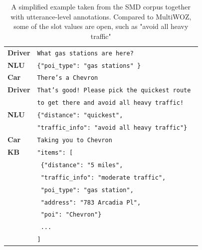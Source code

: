 \begin{table}[tp]
    \centering
    \begin{tabular}{l|l}
    \toprule
         \textbf{Driver} & \texttt{What {\color{cyan!80!yellow!80!black!100}gas stations} are here?} \\
         \textbf{NLU} & \texttt{\{"poi\_type": "{\color{cyan!80!yellow!80!black!100}gas stations}" \}} \\
         \textbf{Car} & \texttt{There's a Chevron} \\
         \textbf{Driver} & \texttt{That's good! Please pick the {\color{cyan!80!yellow!80!black!100}quickest} route }\\ & \texttt{to get there and {\color{orange!50!yellow!90!black!100!}avoid all heavy traffic}!} \\
         \textbf{NLU} & \texttt{\{"distance": "{\color{cyan!80!yellow!80!black!100}quickest}",} \\
            & \texttt{"traffic\_info": "{\color{orange!50!yellow!90!black!100!}avoid all heavy traffic}"\} }\\
         \textbf{Car} & \texttt{Taking you to Chevron} \\
         \midrule
         \textbf{KB} & \texttt{"items": [} \\
          & \texttt{    \{"distance": "5 miles",} \\
          & \texttt{    "traffic\_info": "moderate traffic",} \\
          & \texttt{    "poi\_type": "gas station",} \\
          & \texttt{    "address": "783 Arcadia Pl",} \\
          & \texttt{    "poi": "Chevron"\}} \\
          & \texttt{    ...} \\
          & \texttt{]} \\
          \bottomrule
    \end{tabular}
    \caption{A simplified example taken from the SMD corpus together with utterance-level annotations. Compared to MultiWOZ, some of the slot values are open, such as "avoid all heavy traffic"}
    \label{02:tab:smd_example}
\end{table}
